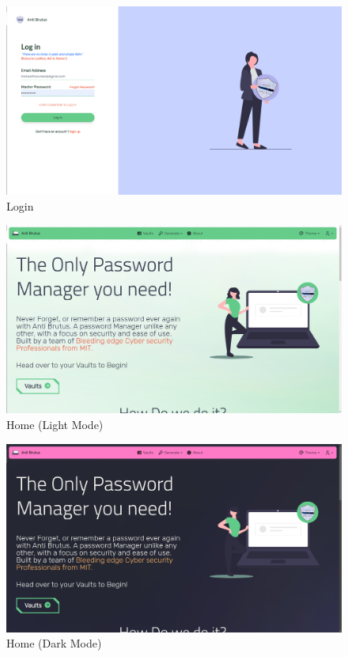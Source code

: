 \documentclass[11pt]{article}
\begin{document}
\begin{figure}[H]
    \centering
    \includegraphics[width=.95\textwidth]{../design/screenshots/login_light.png}
    \caption{Login}
\end{figure}

\begin{figure}[H]
    \centering
    \includegraphics[width=.95\textwidth]{../design/screenshots/home_light.png}
    \caption{Home (Light Mode)}
\end{figure}

\begin{figure}[H]
    \centering
    \includegraphics[width=.95\textwidth]{../design/screenshots/home_dark.png}
    \caption{Home (Dark Mode)}
\end{figure}
\end{document}
